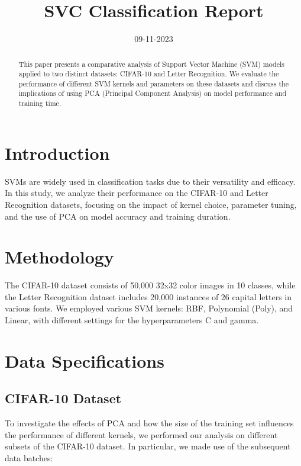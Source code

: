 \documentclass[conference]{IEEEtran}
\title{\Huge SVC Classification Report}
\author{\IEEEauthorblockN{Papagrigoriou Vasileios Savvas}
\IEEEauthorblockA{Auth}}
\date{09-11-2023}
\begin{document}
\maketitle

\begin{abstract}
This paper presents a comparative analysis of Support Vector Machine (SVM) models applied to two distinct datasets: CIFAR-10 and Letter Recognition. We evaluate the performance of different SVM kernels and parameters on these datasets and discuss the implications of using PCA (Principal Component Analysis) on model performance and training time.
\end{abstract}

\section{Introduction}
SVMs are widely used in classification tasks due to their versatility and efficacy. In this study, we analyze their performance on the CIFAR-10 and Letter Recognition datasets, focusing on the impact of kernel choice, parameter tuning, and the use of PCA on model accuracy and training duration.

\section{Methodology}
The CIFAR-10 dataset consists of 50,000 32x32 color images in 10 classes, while the Letter Recognition dataset includes 20,000 instances of 26 capital letters in various fonts. We employed various SVM kernels: RBF, Polynomial (Poly), and Linear, with different settings for the hyperparameters C and gamma.

\section{Data Specifications}

\subsection{CIFAR-10 Dataset}

To investigate the effects of PCA and how the size of the training set influences the performance of different kernels, we performed our analysis on different subsets of the CIFAR-10 dataset. In particular, we made use of the subsequent data batches:
\end{document}
